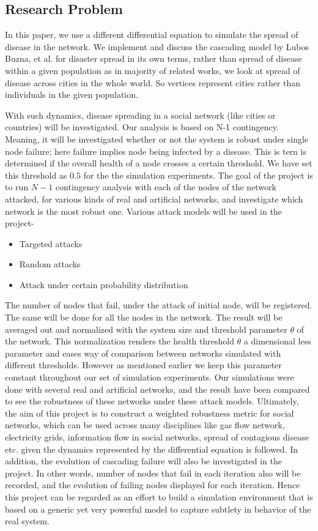 \documentclass[11pt]{article}
\begin{document}
\subsection{Research Problem}
In this paper, we use a different differential equation to simulate the spread of disease in the network. We implement and discuss the cascading model by Lubos Buzna, et al. \cite{helbing} for disaster spread in its own terms, rather than spread of disease within a given population as in majority of related works, we look at spread of disease across cities in the whole world. So vertices represent cities rather than individuals in the given population.

With such dynamics, disease spreading in a social network (like cities or countries) will be investigated.  Our analysis is based on N-1 contingency. Meaning, it will be investigated whether or not the system is robust under single node failure; here failure implies node being infected by a disease. This is tern is determined if the overall health of a node crosses a certain threshold. We have set this threshold as $0.5$ for the the simulation experiments. The goal of the project is to run $N-1$ contingency analysis with each of the nodes of the network attacked, for various kinds of real and artificial networks, and investigate which network is the most robust one. Various attack models will be used in the project- 

\begin{itemize}
\item Targeted attacks
\item Random attacks
\item Attack under certain probability distribution
\end{itemize}

 The number of nodes that fail, under the attack of initial node, will be registered. The same will be done for all the nodes in the network. The result will be averaged out and normalized with the system size and threshold parameter $\theta$ of the network. This normalization renders the health threshold $\theta$ a dimensional less parameter and eases way of comparison between networks simulated with different thresholds. However as mentioned earlier we keep this parameter constant throughout our set of simulation experiments. Our simulations were done with several real and artificial networks, and the result have been compared to see the robustness of these networks under these attack models. Ultimately, the aim of this project is to construct a weighted robustness metric for social networks, which can be used across many disciplines like gas flow network, electricity grids, information flow in social networks, spread of contagious disease etc. given the dynamics represented by the differential equation is followed. In addition, the evolution of cascading failure will also be investigated in the project. In other words, number of nodes that fail in each iteration also will be recorded, and the evolution of failing nodes displayed for each iteration. Hence this project can be regarded as an effort to build a simulation environment that is based on a generic yet very powerful model to capture subtlety in behavior of the real system.
\end{document}
